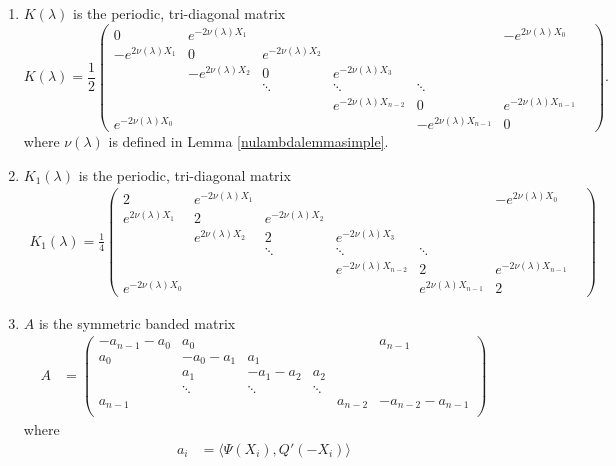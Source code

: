 \documentclass[thesis.tex]{subfiles}
\begin{document}
\begin{theorem}
\begin{enumerate}
\item $K(\lambda)$ is the periodic, tri-diagonal matrix
\begin{equation}
K(\lambda) = \frac{1}{2}
\begin{pmatrix}
0 & e^{-2\nu(\lambda)X_1} & & & & -e^{2 \nu(\lambda)X_0} \\
-e^{2\nu(\lambda)X_1} & 0 & e^{-2\nu(\lambda)X_2} \\
& -e^{2 \nu(\lambda)X_2} & 0 & e^{-2\nu(\lambda)X_3} \\
& & \ddots & \ddots & \ddots &&  \\
&&& e^{-2\nu(\lambda)X_{n-2}} & 0 & e^{-2\nu(\lambda)X_{n-1}} \\
e^{-2\nu(\lambda)X_0} & & & & -e^{2 \nu(\lambda)X_{n-1}} & 0
\end{pmatrix}.
\end{equation}
where $\nu(\lambda)$ is defined in Lemma \ref{nulambdalemmasimple}.

\item $K_1(\lambda)$ is the periodic, tri-diagonal matrix
\begin{align}
K_1(\lambda) = \frac{1}{4}
\begin{pmatrix}
2 & e^{-2\nu(\lambda)X_1} & & & & -e^{2 \nu(\lambda)X_0} \\
e^{2\nu(\lambda)X_1} & 2 & e^{-2\nu(\lambda)X_2} \\
& e^{2 \nu(\lambda)X_2} & 2 & e^{-2\nu(\lambda)X_3} \\
& & \ddots & \ddots & \ddots &&  \\
&&& e^{-2\nu(\lambda)X_{n-2}} & 2 & e^{-2\nu(\lambda)X_{n-1}} \\
e^{-2\nu(\lambda)X_0} & & & & e^{2 \nu(\lambda)X_{n-1}} & 2
\end{pmatrix}
\end{align}

\item $A$ is the symmetric banded matrix
\begin{align}\label{Asymm}
A &= \begin{pmatrix}
-a_{n-1} - a_0 & a_0 & & &  & a_{n-1}\\
a_0 & -a_0 - a_1 &  a_1 \\
& a_1 & -a_1 - a_2 &  a_2 \\
& \ddots & \ddots & \ddots \\
a_{n-1} & & & & a_{n-2} & -a_{n-2} - a_{n-1} \\
\end{pmatrix}
\end{align}
where
\begin{align*}
a_i &= \langle \Psi(X_i), Q'(-X_i) \rangle
\end{align*}


\end{enumerate}
\end{theorem}
\end{document}
